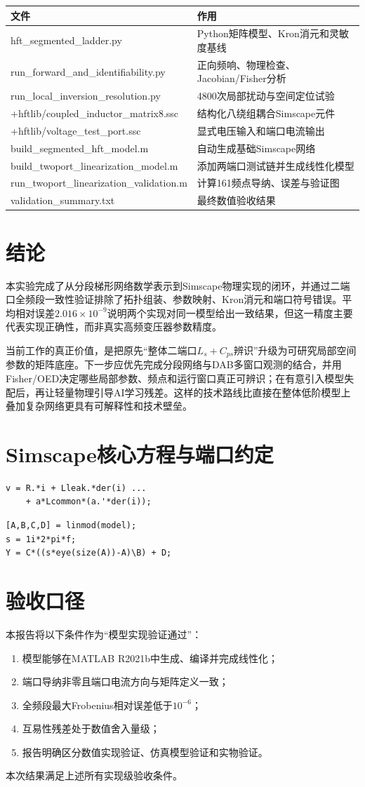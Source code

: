 \documentclass[UTF8,12pt,a4paper]{ctexart}
\begin{document}
\begin{longtable}{>{\raggedright\arraybackslash\ttfamily\footnotesize}p{}p{}}
\toprule
文件 & 作用\\
\midrule
\endhead
hft\_segmented\_ladder.py & Python矩阵模型、Kron消元和灵敏度基线\\
run\_forward\_and\_identifiability.py & 正向频响、物理检查、Jacobian/Fisher分析\\
run\_local\_inversion\_resolution.py & 4800次局部扰动与空间定位试验\\
+hftlib/coupled\_inductor\_matrix8.ssc & 结构化八绕组耦合Simscape元件\\
+hftlib/voltage\_test\_port.ssc & 显式电压输入和端口电流输出\\
build\_segmented\_hft\_model.m & 自动生成基础Simscape网络\\
build\_twoport\_linearization\_model.m & 添加两端口测试链并生成线性化模型\\
run\_twoport\_linearization\_validation.m & 计算161频点导纳、误差与验证图\\
validation\_summary.txt & 最终数值验收结果\\
\bottomrule
\end{longtable}

\section{结论}
本实验完成了从分段梯形网络数学表示到Simscape物理实现的闭环，并通过二端口全频段一致性验证排除了拓扑组装、参数映射、Kron消元和端口符号错误。平均相对误差\(2.016\times10^{-9}\)说明两个实现对同一模型给出一致结果，但这一精度主要代表实现正确性，而非真实高频变压器参数精度。

当前工作的真正价值，是把原先“整体二端口\(L_s+C_{ps}\)辨识”升级为可研究局部空间参数的矩阵底座。下一步应优先完成分段网络与DAB多窗口观测的结合，并用Fisher/OED决定哪些局部参数、频点和运行窗口真正可辨识；在有意引入模型失配后，再让轻量物理引导AI学习残差。这样的技术路线比直接在整体低阶模型上叠加复杂网络更具有可解释性和技术壁垒。

\appendix
\section{Simscape核心方程与端口约定}
\begin{verbatim}
v = R.*i + Lleak.*der(i) ...
    + a*Lcommon*(a.'*der(i));
\end{verbatim}

\begin{verbatim}
[A,B,C,D] = linmod(model);
s = 1i*2*pi*f;
Y = C*((s*eye(size(A))-A)\B) + D;
\end{verbatim}

\section{验收口径}
本报告将以下条件作为“模型实现验证通过”：
\begin{enumerate}
  \item 模型能够在MATLAB R2021b中生成、编译并完成线性化；
  \item 端口导纳非零且端口电流方向与矩阵定义一致；
  \item 全频段最大Frobenius相对误差低于\(10^{-6}\)；
  \item 互易性残差处于数值舍入量级；
  \item 报告明确区分数值实现验证、仿真模型验证和实物验证。
\end{enumerate}
本次结果满足上述所有实现级验收条件。
\end{document}
